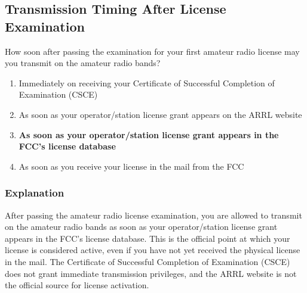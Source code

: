 \subsection{Transmission Timing After License Examination}
\label{T1C10}

\begin{tcolorbox}[colback=gray!10!white,colframe=black!75!black,title=T1C10]
How soon after passing the examination for your first amateur radio license may you transmit on the amateur radio bands?
\begin{enumerate}[label=\Alph*,noitemsep]
    \item Immediately on receiving your Certificate of Successful Completion of Examination (CSCE)
    \item As soon as your operator/station license grant appears on the ARRL website
    \item \textbf{As soon as your operator/station license grant appears in the FCC’s license database}
    \item As soon as you receive your license in the mail from the FCC
\end{enumerate}
\end{tcolorbox}

\subsubsection*{Explanation}
After passing the amateur radio license examination, you are allowed to transmit on the amateur radio bands as soon as your operator/station license grant appears in the FCC’s license database. This is the official point at which your license is considered active, even if you have not yet received the physical license in the mail. The Certificate of Successful Completion of Examination (CSCE) does not grant immediate transmission privileges, and the ARRL website is not the official source for license activation.